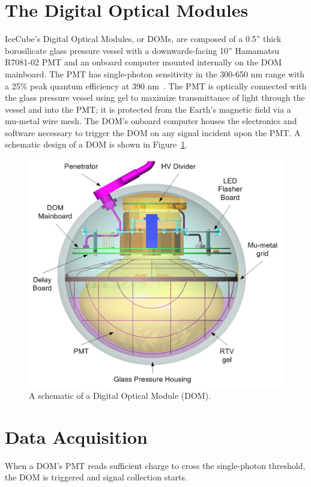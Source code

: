 \documentclass[main.tex]{subfiles}
\begin{document}
\section{The Digital Optical Modules}

IceCube's Digital Optical Modules, or DOMs, are composed of a 0.5'' thick borosilicate glass pressure vessel with a downwards-facing 10'' Hamamatsu R7081-02 PMT and an onboard computer mounted internally on the DOM mainboard.
The PMT has single-photon sensitivity in the 300-650 nm range with a 25\% peak quantum efficiency at 390 nm~\cite{ABBASI2010139}.
The PMT is optically connected with the glass pressure vessel using gel to maximize transmittance of light through the vessel and into the PMT; it is protected from the Earth's magnetic field via a mu-metal wire mesh. 
The DOM's onboard computer houses the electronics and software necessary to trigger the DOM on any signal incident upon the PMT. 
A schematic design of a DOM is shown in Figure~\ref{fig:dom_design}. 


\begin{figure}
    \centering
    \includegraphics[width=0.8\linewidth]{./figures/icecube_dom.png}
    \caption{A schematic of a Digital Optical Module (DOM).}\label{fig:dom_design}
\end{figure}

\section{Data Acquisition}

When a DOM's PMT reads sufficient charge to cross the single-photon threshold, the DOM is triggered and signal collection starts. 
\end{document}
